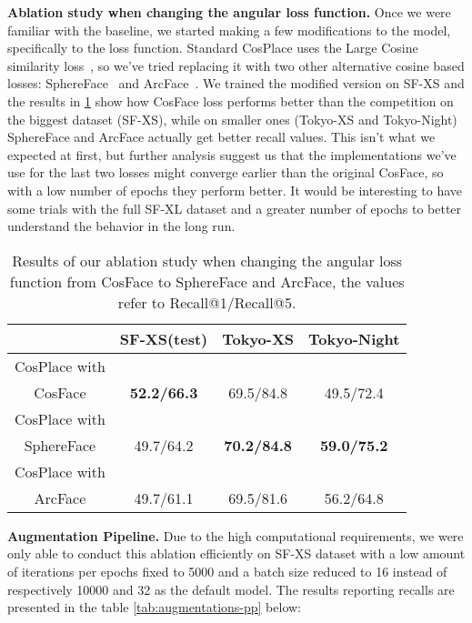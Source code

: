\documentclass[10pt,twocolumn,letterpaper]{article}
\begin{document}
\textbf{Ablation study when changing the angular loss function.}
Once we were familiar with the baseline, we started making a few modifications to the model, specifically to the loss function. Standard CosPlace uses the Large Cosine similarity loss~\cite{cosface}, so we've tried replacing it with two other alternative cosine based losses: SphereFace~\cite{sphereface} and ArcFace~\cite{arcface}.
We trained the modified version on SF-XS and the results in \cref{tab:lossablation} show how CosFace loss performs better than the competition on the biggest dataset (SF-XS), while on smaller ones (Tokyo-XS and Tokyo-Night) SphereFace and ArcFace actually get better recall values. This isn't what we expected at first, but further analysis suggest us that the implementations we've use for the last two losses might converge earlier than the original CosFace, so with a low number of epochs they perform better.
It would be interesting to have some trials with the full SF-XL dataset and a greater number of epochs to better understand the behavior in the long run.

\begin{table}[htp]
  \centering
  \begin{tabular}{@{}cccc@{}}
    \toprule
     & SF-XS(test) & Tokyo-XS & Tokyo-Night\\
    \midrule
    CosPlace with\\ CosFace & \textbf{52.2/66.3} & 69.5/84.8 & 49.5/72.4 \\
    CosPlace with\\ SphereFace & 49.7/64.2 & \textbf{70.2/84.8} & \textbf{59.0/75.2} \\
    CosPlace with\\ ArcFace & 49.7/61.1 & 69.5/81.6 & 56.2/64.8\\
    \bottomrule
  \end{tabular}
  \caption{Results of our ablation study when changing the angular loss function from CosFace to SphereFace and ArcFace, the values refer to Recall@1/Recall@5.}
  \label{tab:lossablation}
\end{table}

\textbf{Augmentation Pipeline.}
Due to the high computational requirements, we were only able to conduct this ablation efficiently on SF-XS dataset with a low amount of iterations per epochs fixed to 5000 and a batch size reduced to 16 instead of respectively 10000 and 32 as the default model. The results reporting recalls are presented in the table \ref{tab:augmentations-pp} below:
\end{document}
